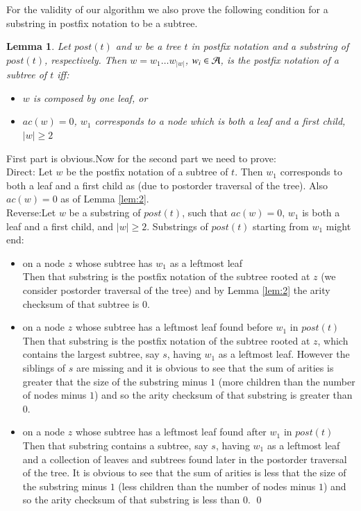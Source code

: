\documentclass[preprint,12pt]{elsarticle}
\newtheorem{lemma}[theorem]{Lemma}
\newenvironment{proof}[1][Proof]{\begin{trivlist}
\item[\hskip \labelsep {\bfseries #1}]}{\end{trivlist}}
\begin{document}
\noindent
For the validity of our algorithm we also prove the following condition for a substring in postfix notation to be a subtree.

\begin{lemma}
\label{lem:4}
Let $\textit{post}(t)$ and $w$ be a tree $t$ in postfix notation and a substring of $\textit{post}(t)$, respectively. 
Then $w=w_1 \ldots w_{|w|}$, $w_i \in {\cal A}$, is the postfix notation of a subtree of $t$ iff:\\
\begin{itemize}
\item $w$ is composed by one leaf, or
\item $ac(w)=0$,  $w_1$ corresponds to a node which is both a leaf and a first child, $|w|\geq2$
\end{itemize}
\end{lemma}
\begin{proof}
First part is obvious.Now for the second part we need to prove:\\
Direct: Let $w$ be the postfix notation of a subtree of $t$. Then  $w_1$ corresponds to both a leaf and a first child as (due to postorder traversal of the tree). Also $ac(w)=0$ as of Lemma \ref{lem:2}.\\
Reverse:Let $w$ be a substring of $\textit{post}(t)$, such that $ac(w)=0$, $w_1$ is both a leaf and a first child, and $|w|\geq2$.
Substrings of $\textit{post}(t)$ starting from $w_1$ might end:
\begin{itemize}
\item on a node $z$ whose subtree has $w_1$ as a leftmost leaf\\
Then that substring is the postfix notation of the subtree rooted at $z$ (we consider postorder traversal of the tree) and by Lemma \ref{lem:2} the arity checksum of that subtree is $0$.
\item on a node $z$ whose subtree has a leftmost leaf found before $w_1$ in $\textit{post}(t)$\\
Then that substring is the postfix notation of the subtree rooted at $z$, which contains the largest subtree, say $s$, having $w_1$ as a leftmost leaf. However the siblings of $s$ are missing and  it is obvious to see that the sum of arities is greater that the size of the substring minus $1$ (more children than the number of nodes minus $1$) and so the arity checksum of that substring is greater than $0$.
\item on a node $z$ whose subtree has a leftmost leaf found after $w_1$ in $\textit{post}(t)$\\
Then that substring contains a subtree, say $s$, having $w_1$ as a leftmost leaf and a collection of leaves 
and subtrees found later in the postorder traversal of the tree. It is obvious to see that the sum of arities 
is less that the size of the substring minus $1$ (less children than the number of nodes minus $1$) and so the 
arity checksum of that substring is less than $0$.
\qed
\end{itemize}
\end{proof}
\end{document}
